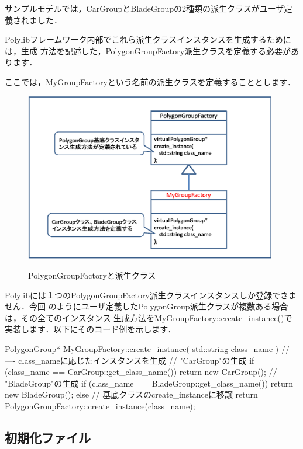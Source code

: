 {サンプルモデルでは，CarGroupとBladeGroupの2種類の派生クラスがユーザ定義されました．


Polylibフレームワーク内部でこれら派生クラスインスタンスを生成するためには，生成
方法を記述した，PolygonGroupFactory派生クラスを定義する必要があります．

ここでは，MyGroupFactoryという名前の派生クラスを定義することとします．

\begin{figure}[H]
 \centering
 \includegraphics[width=11cm]{clip011.eps}\\
 \caption{PolygonGroupFactoryと派生クラス}
\end{figure}

Polylibには１つのPolygonGroupFactory派生クラスインスタンスしか登録できません．今回
のようにユーザ定義したPolygonGroup派生クラスが複数ある場合は，その全てのインスタンス
生成方法をMyGroupFactory::create\_instance()で実装します．以下にそのコード例を示します．

\begin{program}
PolygonGroup*
MyGroupFactory::create_instance( std::string  class_name )
{
    //---- class_nameに応じたインスタンスを生成
    // "CarGroup"の生成
    if (class_name == CarGroup::get_class_name()) {
         return new CarGroup();
    }
    // "BladeGroup"の生成
    if (class_name == BladeGroup::get_class_name()) {
         return new BladeGroup();
    }
    else {
         // 基底クラスのcreate_instanceに移譲
         return PolygonGroupFactory::create_instance(class_name);
    }
}
\end{program}

\pagebreak
%
\subsection{初期化ファイル}

}
